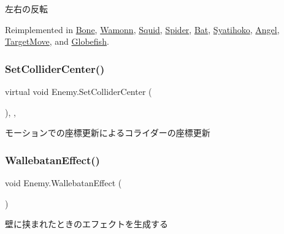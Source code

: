 左右の反転 



Reimplemented in \hyperlink{class_bone_adc5939e68918d95e811cce5bfb87f7e5}{Bone}, \hyperlink{class_wamonn_a84f3f9f2380c28a7e455f0cee6e9c933}{Wamonn}, \hyperlink{class_squid_a7350ce67466554aa0c46c9da7c5e6da2}{Squid}, \hyperlink{class_spider_aeddc709039ca9a096e53ecc0dd0d3f84}{Spider}, \hyperlink{class_bat_a94ef7dfdaf7801f5fa36af5ece127fe1}{Bat}, \hyperlink{class_syatihoko_ab4c8b474dcba39edb7ed80e5149ee39c}{Syatihoko}, \hyperlink{class_angel_ade12610b82079f5748f8d1393cce1f9b}{Angel}, \hyperlink{class_target_move_afb69b9930791bef6aaa96b8d92ce27c2}{Target\+Move}, and \hyperlink{class_globefish_a31c4458c5be4f3739e1ceedd69656185}{Globefish}.

\mbox{\label{class_enemy_a050e257a9a9f3b1b01923be24eaa7577}} 
\subsubsection{\texorpdfstring{Set\+Collider\+Center()}{SetColliderCenter()}}
{\footnotesize\ttfamily virtual void Enemy.\+Set\+Collider\+Center (\begin{DoxyParamCaption}{ }\end{DoxyParamCaption})\hspace{0.3cm}{\ttfamily [inline]}, {\ttfamily [protected]}, {\ttfamily [virtual]}}



モーションでの座標更新によるコライダーの座標更新 

\mbox{\label{class_enemy_a5b96db39bbd412b91fb3923a6833e6b5}} 
\subsubsection{\texorpdfstring{Wallebatan\+Effect()}{WallebatanEffect()}}
{\footnotesize\ttfamily void Enemy.\+Wallebatan\+Effect (\begin{DoxyParamCaption}{ }\end{DoxyParamCaption})\hspace{0.3cm}{\ttfamily [inline]}}



壁に挟まれたときのエフェクトを生成する 



